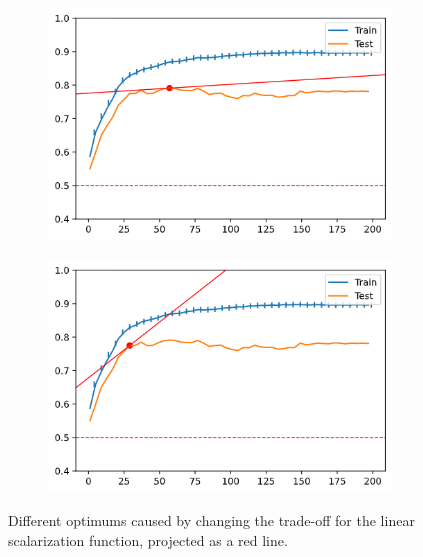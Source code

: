 \begin{figure}[H]
    \centering
    \begin{subfigure}[b]{0.4\linewidth}
        \includegraphics[width=\linewidth]{img/ch4/vanilla200-tradeoff.png}
    \end{subfigure}
    \begin{subfigure}[b]{0.4\linewidth}
        \includegraphics[width=\linewidth]{img/ch4/vanilla200-tradeoffB.png}
    \end{subfigure}
    \caption{Different optimums caused by changing the trade-off for the linear scalarization function, projected as a red line.}
    \label{fig:ch4.tradeoff}
\end{figure}